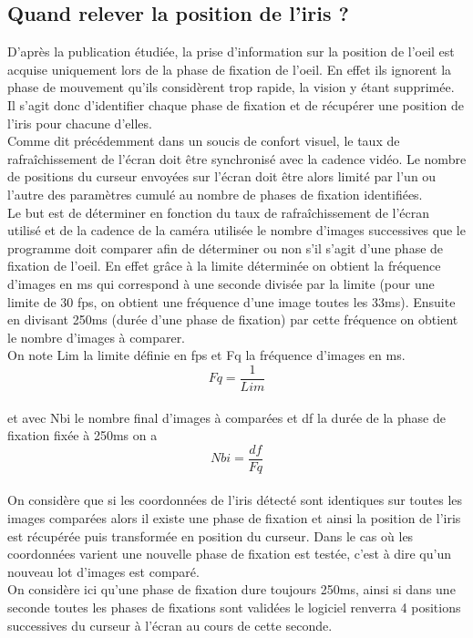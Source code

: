 \documentclass[a4paper, 12pt]{report}
\begin{document}
		\subsection{Quand relever la position de l'iris ?}
D'après la publication étudiée, la prise d'information sur la position de l'oeil est acquise uniquement lors de la phase de fixation de l'oeil. En effet ils ignorent la phase de mouvement qu'ils considèrent trop rapide, la vision y étant supprimée. Il s'agit donc d'identifier chaque phase de fixation et de récupérer une position de l'iris pour chacune d'elles.\\
Comme dit précédemment dans un soucis de confort visuel, le taux de rafraîchissement de l'écran doit être synchronisé avec la cadence vidéo. Le nombre de positions du curseur envoyées sur l'écran doit être alors limité par l'un ou l'autre des paramètres cumulé au nombre de phases de fixation identifiées.\\
Le but est de déterminer en fonction du taux de rafraîchissement de l'écran utilisé et de la cadence de la caméra utilisée le nombre d'images successives que le programme doit comparer afin de déterminer ou non s'il s'agit d'une phase de fixation de l'oeil. En effet grâce à la limite déterminée on obtient la fréquence d'images en ms qui correspond à une seconde divisée par la limite (pour une limite de 30 fps, on obtient une fréquence d'une image toutes les 33ms). Ensuite en divisant 250ms (durée d'une phase de fixation) par cette fréquence on obtient le nombre d'images à comparer. \\
On note Lim la limite définie en fps et Fq la fréquence d'images en ms. \\
$$ Fq = \frac{1}{Lim} $$ \\
et avec Nbi le nombre final d'images à comparées et df la durée de la phase de fixation fixée à 250ms on a \\
$$ Nbi = \frac{df}{Fq} $$ \\
On considère que si les coordonnées de l'iris détecté sont identiques sur toutes les images comparées alors il existe une phase de fixation et ainsi la position de l'iris est récupérée puis transformée en position du curseur. Dans le cas où les coordonnées varient une nouvelle phase de fixation est testée, c'est à dire qu'un nouveau lot d'images est comparé.\\
On considère ici qu'une phase de fixation dure toujours 250ms, ainsi si dans une seconde toutes les phases de fixations sont validées le logiciel renverra 4 positions successives du curseur à l'écran au cours de cette seconde. \\
\end{document}
